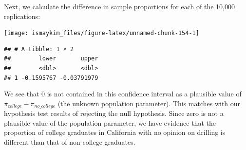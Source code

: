\documentclass[]{tufte-book}
\newenvironment{Shaded}{\begin{snugshade}}{\end{snugshade}}
\newcommand{\KeywordTok}[1]{\textcolor[rgb]{0.13,0.29,0.53}{\textbf{{#1}}}}
\newcommand{\DataTypeTok}[1]{\textcolor[rgb]{0.13,0.29,0.53}{{#1}}}
\newcommand{\DecValTok}[1]{\textcolor[rgb]{0.00,0.00,0.81}{{#1}}}
\newcommand{\FloatTok}[1]{\textcolor[rgb]{0.00,0.00,0.81}{{#1}}}
\newcommand{\StringTok}[1]{\textcolor[rgb]{0.31,0.60,0.02}{{#1}}}
\newcommand{\NormalTok}[1]{{#1}}
\begin{document}
Next, we calculate the difference in sample proportions for each of the
10,000 replications:

\begin{Shaded}
\end{Shaded}

\begin{Shaded}
\end{Shaded}

\begin{center}\texttt{[image: ismaykim\_files/figure-latex/unnamed-chunk-154-1]} \end{center}

\begin{Shaded}
\end{Shaded}

\begin{verbatim}
## # A tibble: 1 × 2
##        lower       upper
##        <dbl>       <dbl>
## 1 -0.1595767 -0.03791979
\end{verbatim}

We see that 0 is not contained in this confidence interval as a
plausible value of \(\pi_{college} - \pi_{no\_college}\) (the unknown
population parameter). This matches with our hypothesis test results of
rejecting the null hypothesis. Since zero is not a plausible value of
the population parameter, we have evidence that the proportion of
college graduates in California with no opinion on drilling is different
than that of non-college graduates.
\end{document}
